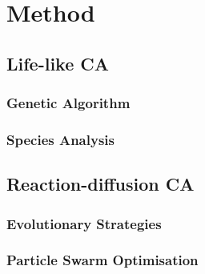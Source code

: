 \chapter{Method}

\section{Life-like CA}

\subsection{Genetic Algorithm}

\subsection{Species Analysis}

\section{Reaction-diffusion CA}

\subsection{Evolutionary Strategies}

\subsection{Particle Swarm Optimisation}